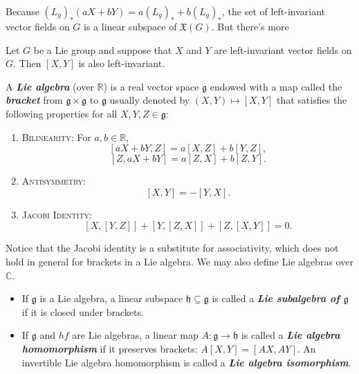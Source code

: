 Because $(L_g)_*(aX+bY)=a(L_g)_*+b(L_g)_*$, the set of left-invariant vector fields on $G$ is a linear subspace of $\mathfrak{X}(G)$. But there's more
\begin{prop}
	Let $G$ be a Lie group and suppose that $X$ and $Y$ are left-invariant vector fields on $G$. Then $[X,Y]$ is also left-invariant.
\end{prop}
\begin{defn}
	A \textbf{\textit{Lie algebra}} (over $\mathbb{R}$) is a real vector space $\mathfrak{g}$ endowed with a map called the \textbf{\textit{bracket}} from $\mathfrak{g}\times\mathfrak{g}$ to $\mathfrak{g}$ usually denoted by $(X,Y)\mapsto[X,Y]$ that satisfies the following properties for all $X,Y,Z\in\mathfrak{g}$:
	\begin{enumerate}
		\item {\scshape Bilinearity:} For $a,b\in\mathbb{R}$,
		\[[aX+bY,Z]=a[X,Z]+b[Y,Z],\]
		\[[Z,aX+bY]=a[Z,X]+b[Z,Y].\]
		\item {\scshape Antisymmetry:}
		\[[X,Y]=-[Y,X].\]
		\item {\scshape Jacobi Identity:}
		\[[X,[Y,Z]]+[Y,[Z,X]]+[Z,[X,Y]]=0.\]
	\end{enumerate}
\end{defn}
Notice that the Jacobi identity is a substitute for associativity, which does not hold in general for brackets in a Lie algebra. We may also define Lie algebras over $\mathbb{C}$.
\begin{defn}\leavevmode
	\begin{itemize}
		\item If $\mathfrak{g}$ is a Lie algebra, a linear subspace $\mathfrak{h}\subseteq\mathfrak{g}$ is called a \textbf{\textit{Lie subalgebra of $\mathfrak{g}$}} if it is closed under brackets.
		\item If $\mathfrak{g}$ and $hf$ are Lie algebras, a linear map $A:\mathfrak{g}\to\mathfrak{h}$ is called a \textbf{\textit{Lie algebra homomorphism}} if it preserves brackets: $A[X,Y]=[AX,AY]$. An invertible Lie algebra homomorphism is called a \textbf{\textit{Lie algebra isomorphism}}.
	\end{itemize}
\end{defn}

